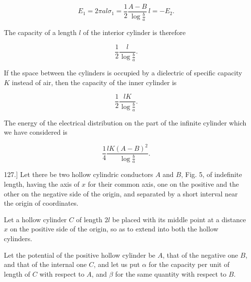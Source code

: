 \documentclass[11pt,a4paper]{article}
\begin{document}
\[
E_1=2\pi al\sigma_1=\frac{1}{2}\frac{A-B}{\log\frac{b}{a}}\,l=-E_2.
\]

The capacity of a length $l$ of the interior cylinder is therefore

\[
\frac{1}{2} \frac{l}{\log \frac{b}{a}}.
\]

If the space between the cylinders is occupied by a dielectric of specific capacity $K$ instead of air, then the capacity of the inner cylinder is

\[
\frac{1}{2}\frac{lK}{\log\frac{b}{a}}.
\]

The energy of the electrical distribution on the part of the infinite cylinder which we have considered is

\[
\frac{1}{4}\frac{lK(A-B)^2}{\log\frac{b}{a}}.
\]

\begin{center}
\end{center}

127.] Let there be two hollow cylindric conductors $A$ and $B$, Fig. 5, of indefinite length, having the axis of $x$ for their common axis, one on the positive and the other on the negative side of the origin, and separated by a short interval near the origin of coordinates.

Let a hollow cylinder $C$ of length $2l$ be placed with its middle point at a distance $x$ on the positive side of the origin, so as to extend into both the hollow cylinders.

Let the potential of the positive hollow cylinder be $A$, that of the negative one $B$, and that of the internal one $C$, and let us put $\alpha$ for the capacity per unit of length of $C$ with respect to $A$, and $\beta$ for the same quantity with respect to $B$.
\end{document}
